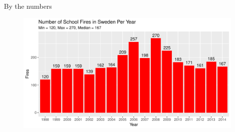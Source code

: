 \documentclass{beamer}
\begin{document}
\begin{frame}{By the numbers}
\begin{figure}[H]
\centering
\includegraphics[width=1\linewidth]{FiresPerYear}
\end{figure}
\end{frame}
\end{document}
